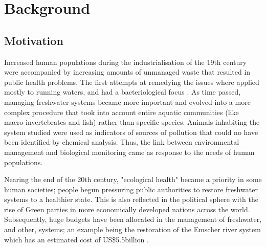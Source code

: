 
\chapter{Background}  %

\ifpdf
    \graphicspath{{Chapter1/Figs/Raster/}{Chapter1/Figs/PDF/}{Chapter1/Figs/}}
\else
    \graphicspath{{Chapter1/Figs/Vector/}{Chapter1/Figs/}}
\fi


\section{Motivation}



Increased human populations during the industrialisation of the 19th century were accompanied by increasing amounts of unmanaged waste that resulted in public health problems. The first attempts at remedying the issues where applied mostly to running waters, and had a bacteriological focus \cite{AQUATIC_INSECTS_BIOMONITORING}. As time passed, managing freshwater systems became more important and evolved into a more complex procedure that took into account entire aquatic communities (like macro-invertebrates and fish) rather than specific species. Animals inhabiting the system studied were used as indicators of sources of pollution that could no have been identified by chemical analysis. Thus, the link between environmental management and biological monitoring came as response to the needs of human populations.



Nearing the end of the 20th century, "ecological health" became a priority in some human societies; people begun pressuring public authorities to restore freshwater systems to a healthier state. This is also reflected in the political sphere with the rise of Green parties in more economically developed nations across the world. Subsequently, huge budgets have been allocated in the management of freshwater, and other, systems; an example being the restoration of the Emscher river system which has an estimated cost of US\$5.5billion \cite{emscher}. 


